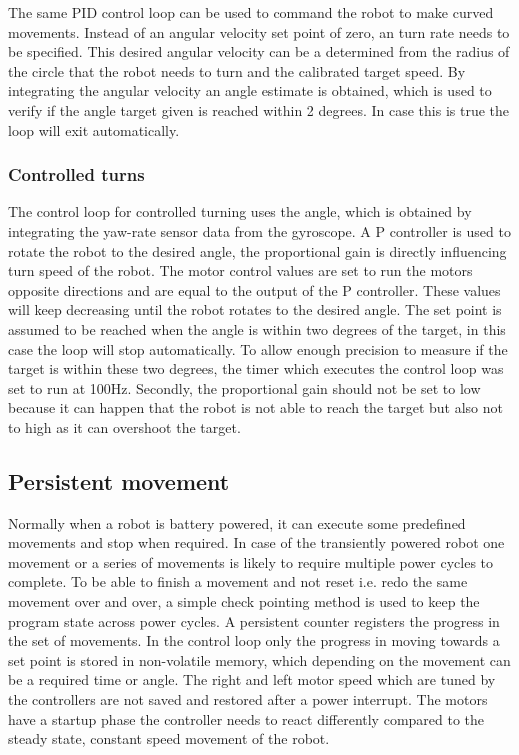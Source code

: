 The same PID control loop can be used to command the robot to make curved movements.
Instead of an angular velocity set point of zero, an turn rate needs to be specified.
This desired angular velocity can be a determined from the radius of the circle that the robot needs to turn and the calibrated target speed.
By integrating the angular velocity an angle estimate is obtained, which is used to verify if the angle target given is reached within 2 degrees.
In case this is true the loop will exit automatically.

\subsubsection{Controlled turns}

The control loop for controlled turning uses the angle, which is obtained by integrating the yaw-rate sensor data from the gyroscope.
A P controller is used to rotate the robot to the desired angle, the proportional gain is directly influencing turn speed of the robot.
The motor control values are set to run the motors opposite directions and are equal to the output of the P controller.
These values will keep decreasing until the robot rotates to the desired angle.
The set point is assumed to be reached when the angle is within two degrees of the target, in this case the loop will stop automatically.
To allow enough precision to measure if the target is within these two degrees, the timer which executes the control loop was set to run at 100Hz.
Secondly, the proportional gain should not be set to low because it can happen that the robot is not able to reach the target but also not to high as it can overshoot the target.

\subsection{Persistent movement}

Normally when a robot is battery powered, it can execute some predefined movements and stop when required.
In case of the transiently powered robot one movement or a series of movements is likely to require multiple power cycles to complete.
To be able to finish a movement and not reset i.e. redo the same movement over and over, a simple check pointing method is used to keep the program state across power cycles.
A persistent counter registers the progress in the set of movements.
In the control loop only the progress in moving towards a set point is stored in non-volatile memory, which depending on the movement can be a required time or angle.
The right and left motor speed which are tuned by the controllers are not saved and restored after a power interrupt.
The motors have a startup phase the controller needs to react differently compared to the steady state, constant speed movement of the robot. 